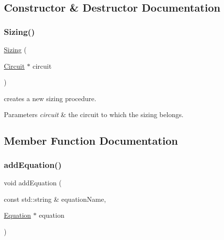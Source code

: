 \subsection{Constructor \& Destructor Documentation}
\mbox{\label{class_open_chams_1_1_sizing_aa1e5f28af7b674134fda04ce64bf1004}} 
\subsubsection{\texorpdfstring{Sizing()}{Sizing()}}
{\footnotesize\ttfamily \mbox{\hyperlink{class_open_chams_1_1_sizing}{Sizing}} (\begin{DoxyParamCaption}\item[{\mbox{\hyperlink{class_open_chams_1_1_circuit}{Circuit}} $\ast$}]{circuit }\end{DoxyParamCaption})}



creates a new sizing procedure. 


\begin{DoxyParams}{Parameters}
{\em circuit} & the circuit to which the sizing belongs. \\
\hline
\end{DoxyParams}


\subsection{Member Function Documentation}
\mbox{\label{class_open_chams_1_1_sizing_a01f8823628bb567d1c463c8bef314ca7}} 
\subsubsection{\texorpdfstring{add\+Equation()}{addEquation()}}
{\footnotesize\ttfamily void add\+Equation (\begin{DoxyParamCaption}\item[{const std\+::string \&}]{equation\+Name,  }\item[{\mbox{\hyperlink{class_open_chams_1_1_equation}{Equation}} $\ast$}]{equation }\end{DoxyParamCaption})}



